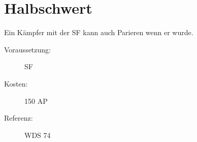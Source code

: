 \section{Halbschwert}
\label{sf.halbschwert}
Ein Kämpfer mit der SF  kann auch Parieren wenn er  wurde.
\begin{description}
    \item[Voraussetzung:]
        SF 
    \item [Kosten:]
        150 AP
    \item [Referenz:]
        WDS 74
\end{description}
